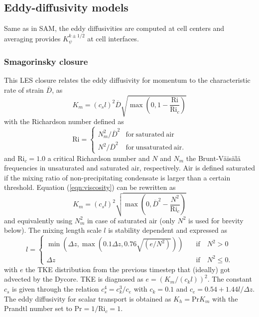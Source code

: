 \documentclass[dvipdfmx,a4paper,10pt]{article}
\begin{document}
\subsection{Eddy-diffusivity models}

Same as in SAM, the eddy diffusivities are computed at cell centers and averaging provides $K_{\psi}^{k\pm 1/2}$ at cell interfaces. 

\subsubsection{Smagorinsky closure}

This LES closure relates the eddy diffusivity for momentum to the characteristic rate of strain $\overline{D}$, as
\begin{equation}\label{eqn:viscosity}
K_m=(c_s l)^2 \overline{D}\sqrt{\max\left(0,1-\frac{\mathrm{Ri}}{\mathrm{Ri}_{c}}\right)}
\end{equation}
with the Richardson number defined as 
\begin{equation}
 \mathrm{Ri}=\left\{
\begin{array}{ll}
N_m^2/\overline{D}^2&\mathrm{for~saturated~air}\\
N^2/\overline{D}^2&\mathrm{for~unsaturated~air}.
\end{array}
\right.  
\end{equation} 
and $\mathrm{Ri}_c=1.0$ a critical Richardson number and $N$ and $N_m$ the Brunt-V\"{a}is\"{a}l\"{a} frequencies in unsaturated and saturated air, respectively. Air is defined saturated if the mixing ratio of non-precipitating condensate is larger than a certain threshold. Equation (\ref{eqn:viscosity}) can be rewritten as 
\begin{equation}
K_m=(c_s l)^2 \sqrt{\max\left(0,\overline{D}^2-\frac{N^2}{\mathrm{Ri}_{c}}\right)}
\end{equation}
and equivalently using $N_m^2$ in case of saturated air (only $N^2$ is used for brevity below). The mixing length scale $l$ is stability dependent and expressed as
\begin{equation}\label{eqn:lmixsmag}
 l=\left\{ 
 \begin{array}{ll}
 \min(\Delta z, \max(0.1\Delta z, 0.76 \sqrt{(e/N^2)}))&\quad \mathrm{if}\quad N^2>0\\
 \Delta z &\quad \mathrm{if}\quad N^2\leq 0.
 \end{array}
\right.  
\end{equation}
with $e$ the TKE distribution from the previous timestep that (ideally) got advected by the Dycore. TKE is diagnosed as $e = (K_m/(c_kl))^2$. The constant $c_s$ is given through the relation $c_s^4=c_k^3/c_e$ with $c_k=0.1$ and $c_e=0.54+1.44 l/\Delta z$. The eddy diffusivity for scalar transport is obtained as $K_h=\mathrm{Pr}K_m$ with the Prandtl number set to $\mathrm{Pr}=1/\mathrm{Ri}_c=1$. 
\end{document}
